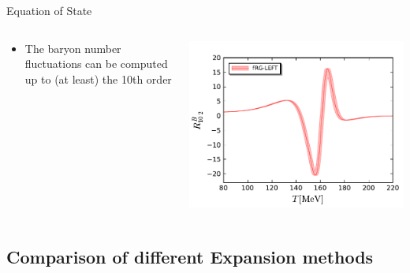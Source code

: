 \begin{frame}[fragile]{Equation of State}
    \begin{columns}
        \begin{column}{0.5\textwidth}
           \begin{itemize}
           \item The baryon number fluctuations can be computed up to (at least) the 10th order
           \end{itemize}
        \end{column}
        \begin{column}{0.5\textwidth}
            \includegraphics[width=1.\linewidth]{Images/Figures/R102-T-muB0.pdf}
            \vspace{-0.8cm}
            \hspace{2cm}{\scriptsize Phys.Rev.D 104 (2021) 9, 094047}            
        \end{column}
    \end{columns}
\end{frame}
\subsection{Comparison of different Expansion methods}

